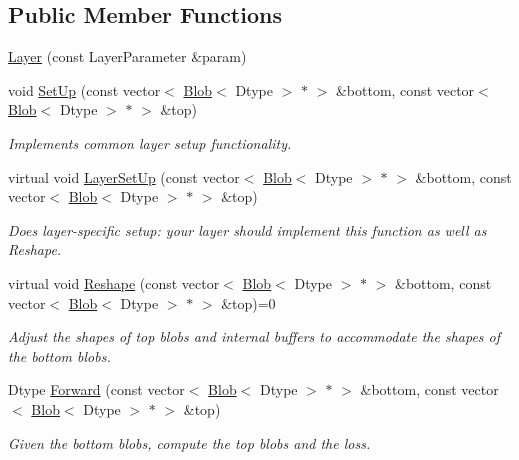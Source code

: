 \subsection*{Public Member Functions}
\begin{DoxyCompactItemize}
\item 
\hyperlink{classcaffe_1_1Layer_a7b4e4ccea08c7b8b15acc6829d5735f6}{Layer} (const Layer\+Parameter \&param)
\item 
void \hyperlink{classcaffe_1_1Layer_ac427a267f4c5ba93caac53b7ba64841d}{Set\+Up} (const vector$<$ \hyperlink{classcaffe_1_1Blob}{Blob}$<$ Dtype $>$ $\ast$ $>$ \&bottom, const vector$<$ \hyperlink{classcaffe_1_1Blob}{Blob}$<$ Dtype $>$ $\ast$ $>$ \&top)
\begin{DoxyCompactList}\small\item\em Implements common layer setup functionality. \end{DoxyCompactList}\item 
virtual void \hyperlink{classcaffe_1_1Layer_a38dc2488bf319b8de5a7ac84e0045393}{Layer\+Set\+Up} (const vector$<$ \hyperlink{classcaffe_1_1Blob}{Blob}$<$ Dtype $>$ $\ast$ $>$ \&bottom, const vector$<$ \hyperlink{classcaffe_1_1Blob}{Blob}$<$ Dtype $>$ $\ast$ $>$ \&top)
\begin{DoxyCompactList}\small\item\em Does layer-\/specific setup\+: your layer should implement this function as well as Reshape. \end{DoxyCompactList}\item 
virtual void \hyperlink{classcaffe_1_1Layer_ad9d391b972c769c0ebee34ca6d1c973e}{Reshape} (const vector$<$ \hyperlink{classcaffe_1_1Blob}{Blob}$<$ Dtype $>$ $\ast$ $>$ \&bottom, const vector$<$ \hyperlink{classcaffe_1_1Blob}{Blob}$<$ Dtype $>$ $\ast$ $>$ \&top)=0
\begin{DoxyCompactList}\small\item\em Adjust the shapes of top blobs and internal buffers to accommodate the shapes of the bottom blobs. \end{DoxyCompactList}\item 
Dtype \hyperlink{classcaffe_1_1Layer_aa5fc9ddb31b58958653372bdaaccde94}{Forward} (const vector$<$ \hyperlink{classcaffe_1_1Blob}{Blob}$<$ Dtype $>$ $\ast$ $>$ \&bottom, const vector$<$ \hyperlink{classcaffe_1_1Blob}{Blob}$<$ Dtype $>$ $\ast$ $>$ \&top)
\begin{DoxyCompactList}\small\item\em Given the bottom blobs, compute the top blobs and the loss. \end{DoxyCompactList}\item 

\end{DoxyCompactItemize}
